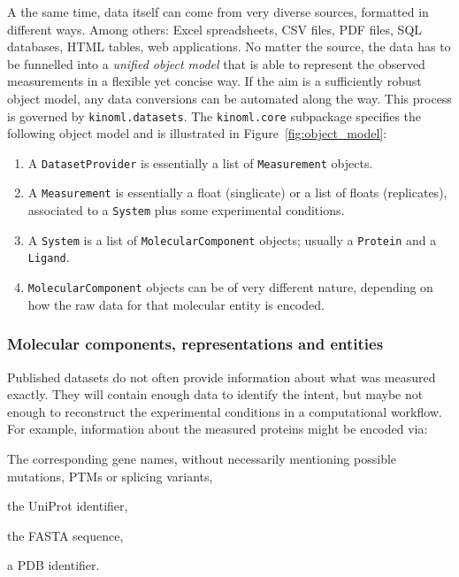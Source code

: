 \documentclass[9pt,lineno]{elife}
\begin{document}
A the same time, data itself can come from very diverse sources, formatted in different ways. Among others: Excel spreadsheets, CSV files, PDF files, SQL databases, HTML tables, web applications. No matter the source, the data has to be funnelled into a \textit{unified object model} that is able to represent the observed measurements in a flexible yet concise way. If the aim is a sufficiently robust object model, any data conversions can be automated along the way. This process is governed by \texttt{kinoml.datasets}. The \texttt{kinoml.core} subpackage specifies the following object model and is illustrated in Figure~\ref{fig:object_model}:

\begin{enumerate}
    \item A \texttt{DatasetProvider} is essentially a list of \texttt{Measurement} objects.
    \item A \texttt{Measurement} is essentially a float (singlicate) or a list of floats (replicates), associated to a \texttt{System} plus some experimental conditions.
    \item A \texttt{System} is a list of \texttt{MolecularComponent} objects; usually a \texttt{Protein} and a \texttt{Ligand}.
    \item \texttt{MolecularComponent} objects can be of very different nature, depending on how the raw data for that molecular entity is encoded.
\end{enumerate}

\subsubsection{Molecular components, representations and entities}
Published datasets do not often provide information about what was measured exactly. They will contain enough data to identify the intent, but maybe not enough to reconstruct the experimental conditions in a computational workflow. For example, information about the measured proteins might be encoded via:

\begin{enumerate*}[label=(\roman*)]
    \item The corresponding gene names, without necessarily mentioning possible mutations, PTMs or splicing variants,
    \item the UniProt identifier,
    \item the FASTA sequence,
    \item a PDB identifier.
\end{enumerate*}
\end{document}
